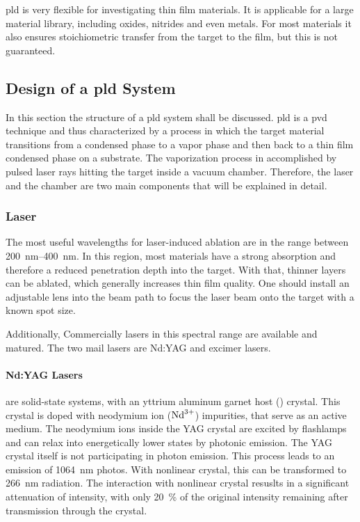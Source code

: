 \Ac{pld} is very flexible for investigating thin film materials.
It is applicable for a large material library, including oxides, nitrides and even
metals. 
For most materials it also ensures stoichiometric transfer from the target to the film,
but this is not guaranteed.

\subsection{Design of a \ac{pld} System}
In this section the structure of a \ac{pld} system shall be discussed.
\ac{pld} is a \ac{pvd} technique and thus characterized by a process in which the target
material transitions from a condensed phase to a vapor phase and then back to a thin 
film condensed phase on a substrate.
The vaporization process in accomplished by pulsed laser rays hitting the target inside
a vacuum chamber. 
Therefore, the laser and the chamber are  two main components that will be
explained in detail.

\subsubsection{Laser}
The most useful wavelengths for laser-induced ablation are in the range between
\qtyrange{200}{400}{\nano \meter}. 
In this region, most materials have a strong absorption and therefore a reduced 
penetration depth into the target. 
With that, thinner layers can be ablated, which generally increases thin film quality.
One should install an adjustable lens into the beam path to focus the laser beam onto 
the target with a known spot size.

Additionally, Commercially lasers in this spectral range are available and matured.
The two mail lasers are Nd:YAG and excimer lasers.
\paragraph{Nd:YAG Lasers}
are solid-state systems, with an yttrium aluminum garnet host ()
crystal.
This crystal is doped with neodymium ion ($\ce{Nd^{{3+}}}$) impurities, that serve as an
active medium.
The neodymium ions inside the YAG crystal are excited by flashlamps and can 
relax into energetically lower states by photonic emission. 
The YAG crystal itself is not participating in photon emission.
This process leads to an emission of \qty{1064}{\nano\meter} photos.
With nonlinear crystal, this can be transformed to \qty{266}{\nano\meter} radiation.
The interaction with nonlinear crystal resuslts in a significant attenuation of intensity,
with only \qty{20}{\percent} of the original intensity remaining after transmission 
through the crystal.

